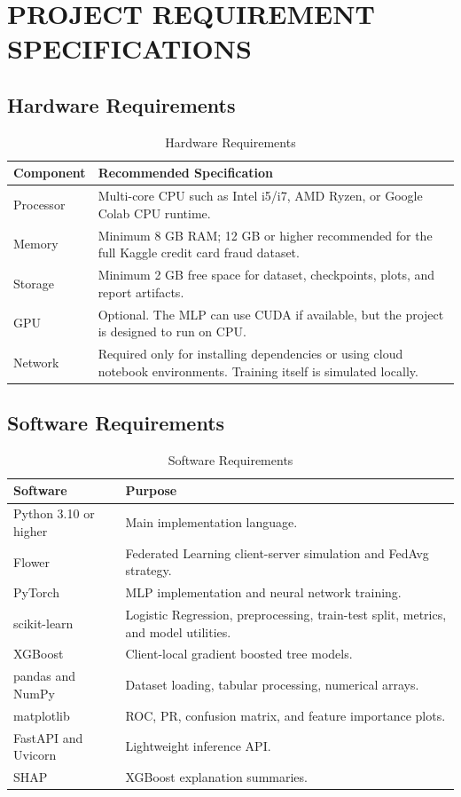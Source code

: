 \chapter{PROJECT REQUIREMENT SPECIFICATIONS}

\section{Hardware Requirements}
\begin{table}[H]
\centering
\caption{Hardware Requirements}
\begin{tabular}{|p{4cm}|p{9cm}|}
\hline
\textbf{Component} & \textbf{Recommended Specification} \\
\hline
Processor & Multi-core CPU such as Intel i5/i7, AMD Ryzen, or Google Colab CPU runtime. \\
\hline
Memory & Minimum 8 GB RAM; 12 GB or higher recommended for the full Kaggle credit card fraud dataset. \\
\hline
Storage & Minimum 2 GB free space for dataset, checkpoints, plots, and report artifacts. \\
\hline
GPU & Optional. The MLP can use CUDA if available, but the project is designed to run on CPU. \\
\hline
Network & Required only for installing dependencies or using cloud notebook environments. Training itself is simulated locally. \\
\hline
\end{tabular}
\end{table}

\section{Software Requirements}
\begin{table}[H]
\centering
\caption{Software Requirements}
\begin{tabular}{|p{4cm}|p{9cm}|}
\hline
\textbf{Software} & \textbf{Purpose} \\
\hline
Python 3.10 or higher & Main implementation language. \\
\hline
Flower & Federated Learning client-server simulation and FedAvg strategy. \\
\hline
PyTorch & MLP implementation and neural network training. \\
\hline
scikit-learn & Logistic Regression, preprocessing, train-test split, metrics, and model utilities. \\
\hline
XGBoost & Client-local gradient boosted tree models. \\
\hline
pandas and NumPy & Dataset loading, tabular processing, numerical arrays. \\
\hline
matplotlib & ROC, PR, confusion matrix, and feature importance plots. \\
\hline
FastAPI and Uvicorn & Lightweight inference API. \\
\hline
SHAP & XGBoost explanation summaries. \\
\hline
\end{tabular}
\end{table}

